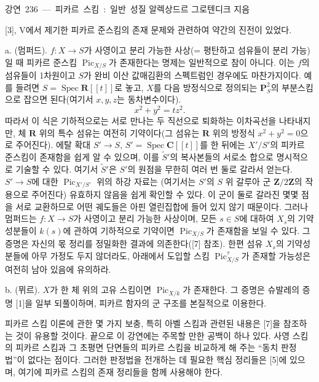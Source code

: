 \unit{강연 236 — 피카르 스킴: 일반 성질}
%
  {알렉상드르 그로텐디크 지음}


[3], V에서 제기한 피카르 준스킴의 존재 문제와 관련하여 약간의 진전이
있었다.

\medskip
\noindent a. (멈퍼드). $f:X\longrightarrow S$가 사영이고 분리 가능한
사상(= 평탄하고 섬유들이 분리 가능)일 때 피카르 준스킴
$\operatorname{Pic}_{X/S}$가 존재한다는 명제는 일반적으로 참이 아니다.
이는 $f$의 섬유들이 1차원이고 $S$가 완비 이산 값매김환의 스펙트럼인
경우에도 마찬가지이다. 예를 들려면
$S=\operatorname{Spec}\mathbf R[[t]]$로 놓고, $X$를 다음 방정식으로
정의되는 $\mathbf P^2_S$의 부분스킴으로 잡으면 된다(여기서 $x,y,z$는
동차변수이다).
\[
x^2+y^2=tz^2.
\]
따라서 이 식은 기하적으로는 서로 만나는 두 직선으로 퇴화하는 이차곡선을
나타내지만, 체 $\mathbf R$ 위의 특수 섬유는 여전히 기약이다(그 섬유는
$\mathbf R$ 위의 방정식 $x^2+y^2=0$으로 주어진다). 에탈 확대
$S'\longrightarrow S$, $S'=\operatorname{Spec}\mathbf C[[t]]$를 한 뒤에는
$X'/S'$의 피카르 준스킴이 존재함을 쉽게 알 수 있으며, 이를
$\widetilde S'$의 복사본들의 서로소 합으로 명시적으로 기술할 수 있다.
여기서 $\widetilde S'$은 $S'$의 원점을 무한히 여러 번 둘로 갈라서 얻는다.
$S'\longrightarrow S$에 대한 $\operatorname{Pic}_{X'/S'}$ 위의 하강 자료는
(여기서는 $S'$의 $S$ 위 갈루아 군 $\mathbf Z/2\mathbf Z$의 작용으로
주어진다) 유효하지 않음을 쉽게 확인할 수 있다. 이 군이 둘로 갈라진 몇몇
점을 서로 교환하므로 어떤 궤도들은 아핀 열린집합에 들어 있지 않기
때문이다. 그러나 멈퍼드는 $f:X\longrightarrow S$가 사영이고 분리 가능한
사상이며, 모든 $s\in S$에 대하여 $X_s$의 기약성분들이 $k(s)$에 관하여
기하적으로 기약이면 $\operatorname{Pic}_{X/S}$가 존재함을 보일 수 있다.
그 증명은 자신의 몫 정리를 정밀화한 결과에 의존한다([7] 참조). 한편
섬유 $X_s$의 기약성분들에 아무 가정도 두지 않더라도, 아래에서 도입할
스킴 $\operatorname{Pic}^{\tau}_{X/S}$가 존재할 가능성은 여전히 남아
있음에 유의하라.

\noindent b. (뮈르). $X$가 한 체 위의 고유 스킴이면
$\operatorname{Pic}_{X/k}$가 존재한다. 그 증명은 슈발레의 증명 [1]을
일부 되풀이하며, 피카르 함자의 군 구조를 본질적으로 이용한다.

피카르 스킴 이론에 관한 몇 가지 보충, 특히 아벨 스킴과 관련된 내용은
[7]을 참조하는 것이 유용할 것이다. 끝으로 이 강연에는 주목할 만한
공백이 하나 있다. 사영 스킴의 피카르 스킴과 그 초평면 단면들의 피카르
스킴을 비교하게 해 주는 ``동치 판정법''이 없다는 점이다. 그러한 판정법을
전개하는 데 필요한 핵심 정리들은 [5]에 있으며, 여기에 피카르 스킴의
존재 정리들을 함께 사용해야 한다.

